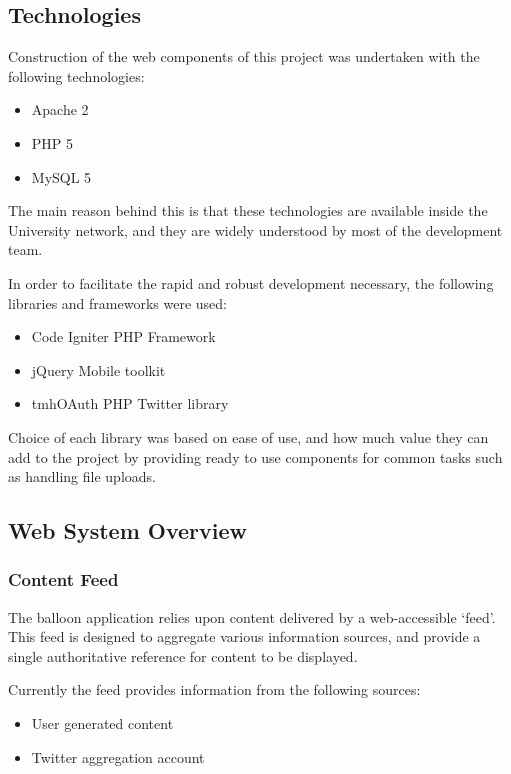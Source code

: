 \subsection{Technologies}

Construction of the web components of this project was undertaken with the following technologies:

\begin{itemize}
	\item Apache 2
	\item PHP 5
	\item MySQL 5
\end{itemize}

The main reason behind this is that these technologies are available inside the University network, and they are widely understood by most of the development team.

In order to facilitate the rapid and robust development necessary, the following libraries and frameworks were used:

\begin{itemize}
	\item Code Igniter PHP Framework
	\item jQuery Mobile toolkit
	\item tmhOAuth PHP Twitter library
\end{itemize}

Choice of each library was based on ease of use, and how much value they can add to the project by providing ready to use components for common tasks such as handling file uploads.

\subsection{Web System Overview}

\subsubsection{Content Feed}

The balloon application relies upon content delivered by a web-accessible `feed'. This feed is designed to aggregate various information sources, and provide a single authoritative reference for content to be displayed.

Currently the feed provides information from the following sources:

\begin{itemize}
	\item User generated content
	\item Twitter aggregation account
\end{itemize}

